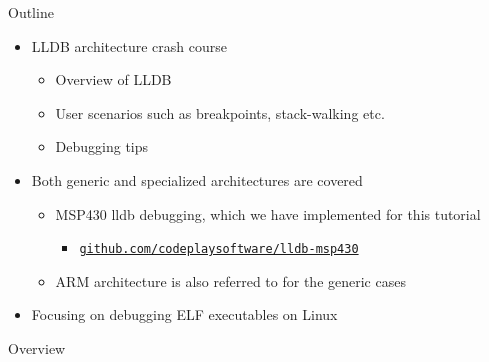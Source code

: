 \documentclass[t]{beamer}
\newcommand{\codeempha}[1]{\textcolor{uiorange}{#1}}
\newcommand{\talkpart}[2]{%
\section{Part #1: #2}

\begin{frame}[c]{Part #1}

\vspace{1cm}
\centerline{\LARGE{#2}}

\end{frame}}
\begin{document}
\begin{frame}{Outline}
\begin{itemize}
    \setlength\itemsep{1em}
    \item LLDB architecture crash course
    \begin{itemize}
        \setlength\itemsep{1em}
        \item Overview of LLDB
        \item User scenarios such as breakpoints, stack-walking etc.
        \item Debugging tips
    \end{itemize}
    \item Both generic and specialized architectures are covered
    \begin{itemize}
        \setlength\itemsep{1em}
        \item \codeempha{MSP430} lldb debugging, which we have implemented for this tutorial
        \begin{itemize}
            \item \href{http://github.com/codeplaysoftware/lldb-msp430}{\nolinkurl{github.com/codeplaysoftware/lldb-msp430}}
       \end{itemize}
        \item \codeempha{ARM} architecture is also referred to for the generic cases
    \end{itemize}
    \item Focusing on debugging \codeempha{ELF} executables on \codeempha{Linux}
\end{itemize}
\end{frame}


\begin{frame}{Overview}
\hypersetup{linkcolor=black}
\tableofcontents
\end{frame}




%

%

%

\end{document}
